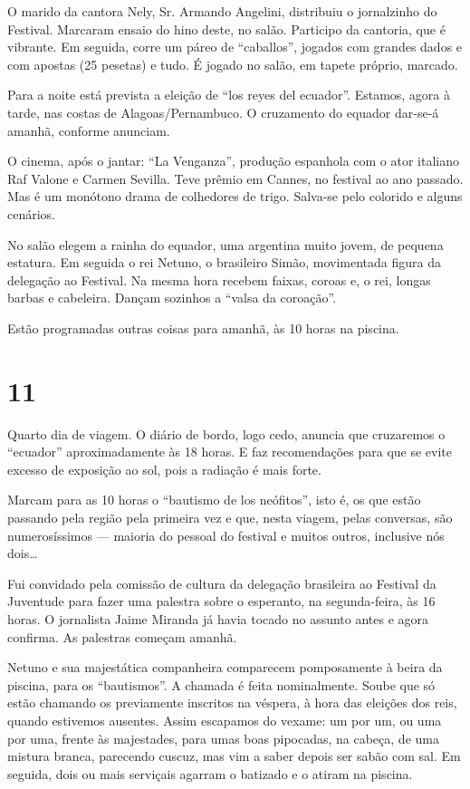 O marido da cantora Nely, Sr. Armando Angelini, distribuiu o jornalzinho do Festival. Marcaram ensaio do hino deste, no salão. Participo da cantoria, que é vibrante. Em seguida, corre um páreo de ``caballos'', jogados com grandes dados e com apostas (25 pesetas) e tudo. É jogado no salão, em tapete próprio, marcado.

Para a noite está prevista a eleição de ``los reyes del ecuador''. Estamos, agora à tarde, nas costas de Alagoas/Pernambuco. O cruzamento do equador dar-se-á amanhã, conforme anunciam.

O cinema, após o jantar: ``La Venganza'', produção espanhola com o ator italiano Raf Valone e Carmen Sevilla. Teve prêmio em Cannes, no festival ao ano passado. Mas é um monótono drama de colhedores de trigo. Salva-se pelo colorido e alguns cenários.

No salão elegem a rainha do equador, uma argentina muito jovem, de pequena estatura. Em seguida o rei Netuno, o brasileiro Simão, movimentada figura da delegação ao Festival. Na mesma hora recebem faixas, coroas e, o rei, longas barbas e cabeleira. Dançam sozinhos a ``valsa da coroação''.

Estão programadas outras coisas para amanhã, às 10 horas na piscina.

\section*{11 \adfflatleafright {}}

Quarto dia de viagem. O diário de bordo, logo cedo, anuncia que cruzaremos o ``ecuador'' aproximadamente às 18 horas. E faz recomendações para que se evite excesso de exposição ao sol, pois a radiação é mais forte.

Marcam para as 10 horas o ``bautismo de los neófitos'', isto é, os que estão passando pela região pela primeira vez e que, nesta viagem, pelas conversas, são numerosíssimos --- maioria do pessoal do festival e muitos outros, inclusive nós dois\ldots

Fui convidado pela comissão de cultura da delegação brasileira ao Festival da Juventude para fazer uma palestra sobre o esperanto, na segunda-feira, às 16 horas. O jornalista Jaime Miranda já havia tocado no assunto antes e agora confirma. As palestras começam amanhã.

Netuno e sua majestática companheira comparecem pomposamente à beira da piscina, para os ``bautismos''. A chamada é feita nominalmente. Soube que só estão chamando os previamente inscritos na véspera, à hora das eleições dos reis, quando estivemos ausentes. Assim escapamos do vexame: um por um, ou uma por uma, frente às majestades, para umas boas pipocadas, na cabeça, de uma mistura branca, parecendo cuscuz, mas vim a saber depois ser sabão com sal. Em seguida, dois ou mais serviçais agarram o batizado e o atiram na piscina.

